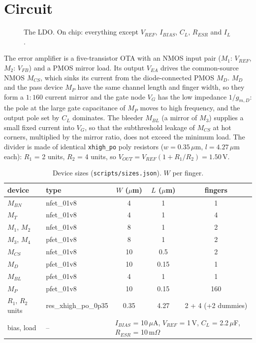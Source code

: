 \documentclass[10pt,a4paper]{article}
\newcommand{\VOUT}{V_{OUT}}
\begin{document}
\section{Circuit}

\begin{figure}[H]
\centering

\caption{The LDO. On chip: everything except $V_{REF}$, $I_{BIAS}$, $C_L$, $R_{ESR}$ and $I_L$.}
\label{fig:sch}
\end{figure}

\noindent The error amplifier is a five-transistor OTA with an NMOS input pair ($M_1$: $V_{REF}$, $M_2$: $V_{FB}$) and a PMOS mirror load. Its output $V_{EA}$ drives the common-source NMOS $M_{CS}$, which sinks its current from the diode-connected PMOS $M_D$. $M_D$ and the pass device $M_P$ have the same channel length and finger width, so they form a $1:160$ current mirror and the gate node $V_G$ has the low impedance $1/g_{m,D}$: the pole at the large gate capacitance of $M_P$ moves to high frequency, and the output pole set by $C_L$ dominates. The bleeder $M_{BL}$ (a mirror of $M_3$) supplies a small fixed current into $V_G$, so that the subthreshold leakage of $M_{CS}$ at hot corners, multiplied by the mirror ratio, does not exceed the minimum load. The divider is made of identical \texttt{xhigh\_po} poly resistors ($w = 0.35\,\mu$m, $l = 4.27\,\mu$m each): $R_1$ = 2 units, $R_2$ = 4 units, so $\VOUT = V_{REF}(1 + R_1/R_2) = 1.50$\,V.

\begin{table}[H]
\centering\small
\caption{Device sizes (\texttt{scripts/sizes.json}). $W$ per finger.}
\begin{tabular}{llccc}
\toprule
device & type & $W$ ($\mu$m) & $L$ ($\mu$m) & fingers \\
\midrule
$M_{BN}$ & nfet\_01v8 & 4 & 1 & 1 \\
$M_T$ & nfet\_01v8 & 4 & 1 & 4 \\
$M_1$, $M_2$ & nfet\_01v8 & 8 & 1 & 2 \\
$M_3$, $M_4$ & pfet\_01v8 & 8 & 1 & 2 \\
$M_{CS}$ & nfet\_01v8 & 10 & 0.5 & 2 \\
$M_D$ & pfet\_01v8 & 10 & 0.15 & 1 \\
$M_{BL}$ & pfet\_01v8 & 4 & 1 & 1 \\
$M_P$ & pfet\_01v8 & 10 & 0.15 & 160 \\
$R_1$, $R_2$ units & res\_xhigh\_po\_0p35 & 0.35 & 4.27 & 2 + 4 (+2 dummies) \\
bias, load & -- & \multicolumn{3}{l}{$I_{BIAS}$ = 10\,$\mu$A, $V_{REF}$ = 1\,V, $C_L$ = 2.2\,$\mu$F, $R_{ESR}$ = 10\,m$\Omega$} \\
\bottomrule
\end{tabular}
\end{table}
\end{document}
